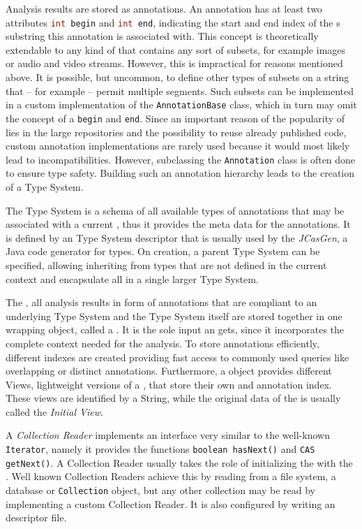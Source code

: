 Analysis results are stored as annotations. An annotation has at least two attributes \lstinline[language=Java]|int begin| and \lstinline[language=Java]|int end|, indicating the start and end index of the \sofa{}s substring this annotation is associated with. This concept is theoretically extendable to any kind of \sofa{} that contains any sort of subsets, for example images or audio and video streams. However, this is impractical for reasons mentioned above. It is possible, but uncommon, to define other types of subsets on a string that -- for example -- permit multiple segments. Such subsets can be implemented in a custom implementation of the \lstinline|AnnotationBase| class, which in turn may omit the concept of a \lstinline|begin| and \lstinline|end|. Since an important reason of the popularity of \uima{} lies in the large \anen{} repositories and the possibility to reuse already published code, custom annotation implementations are rarely used because it would most likely lead to incompatibilities. However, subclassing the \lstinline|Annotation| class is often done to ensure type safety. Building such an annotation hierarchy leads to the creation of a Type System.

The Type System is a schema of all available types of annotations that may be associated with a current \sofa{}, thus it provides the meta data for the annotations. It is defined by an \xml{} Type System descriptor that is usually used by the \emph{JCasGen}, a Java code generator for \uima{} types. On creation, a parent Type System can be specified, allowing inheriting from types that are not defined in the current context and encapsulate all in a single larger Type System.

The \sofa{}, all analysis results in form of annotations that are compliant to an underlying Type System and the Type System itself are stored together in one wrapping object, called a \cas{}. It is the sole input an \anen{} gets, since it incorporates the complete context needed for the analysis. To store annotations efficiently, different indexes are created providing fast access to commonly used queries like overlapping or distinct annotations. Furthermore, a \cas{} object provides different Views, lightweight versions of a \cas{}, that store their own \sofa{} and annotation index. These views are identified by a String, while the original data of the \cas{} is usually called the \emph{Initial View}.

A \emph{Collection Reader} implements an interface very similar to the well-known \lstinline|Iterator|, namely it provides the functions \lstinline|boolean hasNext()| and \lstinline|CAS getNext()|. A Collection Reader usually takes the role of initializing the \cas{} with the \sofa{}. Well known Collection Readers achieve this by reading from a file system, a database or \lstinline|Collection| object, but any other collection may be read by implementing a custom Collection Reader. It is also configured by writing an \xml{} descriptor file.

